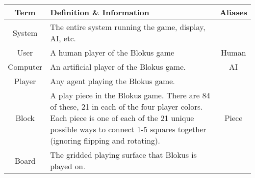 \documentclass[12]{article}
\begin{document}
	\begin{tabular}{| c | p{8cm} | c |}
		\hline
		Term & Definition \& Information & Aliases \\
		\hline
		\hline
		System & The entire system running the game, display, AI, etc. & \\
		\hline
		User & A human player of the Blokus game & Human \\
		\hline
		Computer & An artificial player of the Blokus game. & AI \\
		\hline
		Player & Any agent playing the Blokus game. & \\
		\hline
		Block & A play piece in the Blokus game. There are 84 of these, 21 in each of the four player colors. Each piece is one of each of the 21 unique possible ways to connect 1-5 squares together (ignoring flipping and rotating). & Piece \\
		\hline
		Board & The gridded playing surface that Blokus is played on. & \\
		\hline
	\end{tabular}
\end{document}
